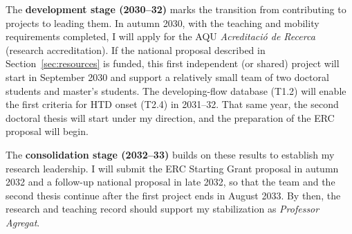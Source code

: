 \documentclass[11pt]{article}
\begin{document}
The \textbf{development stage (2030--32)} marks the transition from contributing to projects to leading them. 
In autumn 2030, with the teaching and mobility requirements completed, I will apply for the AQU \textit{Acreditació de Recerca} (research accreditation). 
If the national proposal described in Section~\ref{sec:resources} is funded, this first independent (or shared) project will start in September 2030 and support a relatively small team of two doctoral students and master's students. 
The developing-flow database (T1.2) will enable the first criteria for HTD onset (T2.4) in 2031--32. That same year, the second doctoral thesis will start under my direction, and the preparation of the ERC proposal will begin.

The \textbf{consolidation stage (2032--33)} builds on these results to establish my research leadership. 
I will submit the ERC Starting Grant proposal in autumn 2032 and a follow-up national proposal in late 2032, so that the team and the second thesis continue after the first project ends in August 2033. 
By then, the research and teaching record should support my stabilization as \textit{Professor Agregat}.
\end{document}
